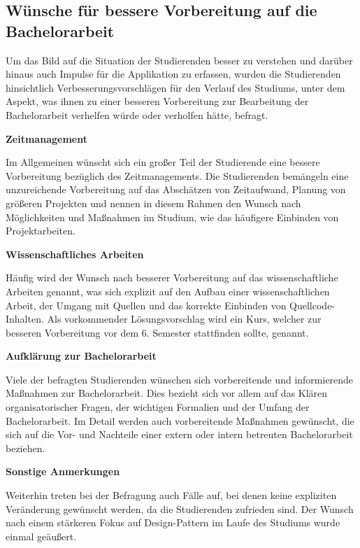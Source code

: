 \documentclass[bibliography=totoc,listof=totoc,BCOR=5mm,DIV=12,oneside]{scrbook}
\begin{document}
\newpage
\subsection{Wünsche für bessere Vorbereitung auf die Bachelorarbeit}
\par Um das Bild auf die Situation der Studierenden besser zu verstehen und darüber hinaus auch Impulse für die Applikation zu erfassen, wurden die Studierenden hinsichtlich Verbesserungsvorschlägen für den Verlauf des Studiums, unter dem Aspekt, was ihnen zu einer besseren Vorbereitung zur Bearbeitung der Bachelorarbeit verhelfen würde oder verholfen hätte, befragt.

\par \bigskip \textbf{Zeitmanagement}
\par Im Allgemeinen wünscht sich ein großer Teil der Studierende eine bessere Vorbereitung bezüglich des Zeitmanagements. Die Studierenden bemängeln eine unzureichende Vorbereitung auf das Abschätzen von Zeitaufwand, Planung von größeren Projekten und nennen in diesem Rahmen den Wunsch nach Möglichkeiten und Maßnahmen im Studium, wie das häufigere Einbinden von Projektarbeiten.

\par \bigskip \textbf{Wissenschaftliches Arbeiten}
\par Häufig wird der Wunsch nach besserer Vorbereitung auf das wissenschaftliche Arbeiten genannt, was sich explizit auf den Aufbau einer wissenschaftlichen Arbeit, der Umgang mit Quellen und das korrekte Einbinden von Quellcode-Inhalten. Als vorkommender Lösungsvorschlag wird ein Kurs, welcher zur besseren Vorbereitung vor dem 6. Semester stattfinden sollte, genannt.

\par \bigskip \textbf{Aufklärung zur Bachelorarbeit}
\par Viele der befragten Studierenden wünschen sich vorbereitende und informierende Maßnahmen zur Bachelorarbeit. Dies bezieht sich vor allem auf das Klären organisatorischer Fragen, der wichtigen Formalien und der Umfang der Bachelorarbeit. Im Detail werden auch vorbereitende Maßnahmen gewünscht, die sich auf die Vor- und Nachteile einer extern oder intern betreuten Bachelorarbeit beziehen.

\par \bigskip \textbf{Sonstige Anmerkungen}
\par Weiterhin treten bei der Befragung auch Fälle auf, bei denen keine expliziten Veränderung gewünscht werden, da die Studierenden zufrieden sind. Der Wunsch nach einem stärkeren Fokus auf Design-Pattern im Laufe des Studiums wurde einmal geäußert.
\end{document}

